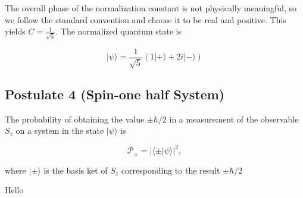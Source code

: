 \documentclass[twocolumn]{article}
\begin{document}
The overall phase of the normalization constant is not physically meaningful, so we follow the standard convention and choose it to be real and positive. This yields $C=\frac{1}{\sqrt{5}}$. The normalized quantum state is 

\begin{equation}
    |\psi\rangle=\frac{1}{\sqrt{5}}(1|+\rangle+2i|-\rangle)
\end{equation}

\subsection{Postulate 4 (Spin-one half System)}

The probability of obtaining the value $\pm\hbar/2$ in a measurement of the observable $S_z$ on a system in the state $|\psi\rangle$ is

\begin{equation}
    \mathcal{P}_\pm=|\langle\pm|\psi\rangle|^2,
\end{equation}

where $|\pm\rangle$ is the basis ket of $S_z$ corresponding to the result $\pm\hbar/2$

Hello
\end{document}
